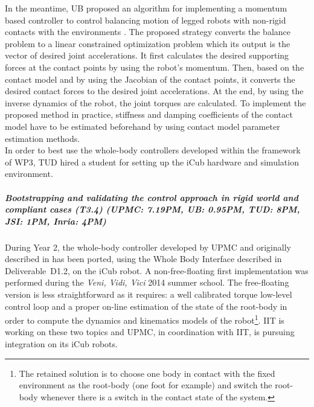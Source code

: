 In the meantime, UB proposed an algorithm for implementing a momentum
based controller to control balancing motion of legged robots with non-rigid
contacts with the environments \cite{Azad&Mistry15}.  The proposed strategy
converts the balance problem to a linear constrained optimization problem
which its output is the vector of desired joint accelerations.  It first
calculates the desired supporting forces at the contact points by using the
robot’s momentum.  Then, based on the contact model and by using the Jacobian
of the contact points, it converts the desired contact forces to the desired
joint accelerations.  At the end, by using the inverse dynamics of the robot,
the joint torques are calculated.  To implement the proposed method in
practice, stiffness and damping coefficients of the contact model have to be
estimated beforehand by using contact model parameter estimation methods.\\
    
In order to best use the whole-body controllers developed within the framework of WP3, TUD hired a student for setting up the iCub hardware and simulation environment.


\subparagraph{Bootstrapping and validating the control approach in rigid world and compliant cases (T3.4) (UPMC: 7.19PM, UB: 0.95PM, TUD: 8PM, JSI: 1PM, Inria: 4PM)}

During Year 2, the whole-body controller developed by UPMC and originally described in \cite{salini2012} has been ported, using the Whole Body Interface described in Deliverable~D1.2, on the iCub robot. A non-free-floating first implementation was performed during the \textit{Veni, Vidi, Vici} 2014 summer school. The free-floating version is less straightforward as it requires: a well calibrated torque low-level control loop and a proper on-line estimation of the state of the root-body in order to  compute the dynamics and kinematics models of the robot\footnote{The retained solution is to choose one body in contact with the fixed environment as the root-body (one foot for example) and switch the root-body whenever there is a switch in the contact state of the system.}. IIT is working on these two topics and UPMC, in coordination with IIT, is pursuing integration on its iCub robots.

